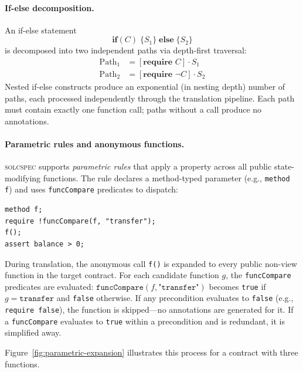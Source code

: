 \paragraph{If-else decomposition.}
An if-else statement
\[
\textbf{if}(C)\; \{S_1\}\; \textbf{else}\; \{S_2\}
\]
is decomposed into two independent paths via depth-first traversal:
\begin{align*}
\text{Path}_1 &= [\textbf{require } C] \cdot S_1 \\
\text{Path}_2 &= [\textbf{require } \neg C] \cdot S_2
\end{align*}
Nested if-else constructs produce an exponential (in nesting depth) number of paths, each processed independently through the translation pipeline. Each path must contain exactly one function call; paths without a call produce no annotations.

\paragraph{Parametric rules and anonymous functions.}
\textsc{solcspec} supports \emph{parametric rules} that apply a property across all public state-modifying functions. The rule declares a method-typed parameter (e.g., \texttt{method f}) and uses \texttt{funcCompare} predicates to dispatch:

\begin{lstlisting}[language=Solidity,basicstyle=\small\ttfamily]
method f;
require !funcCompare(f, "transfer");
f();
assert balance > 0;
\end{lstlisting}

\noindent During translation, the anonymous call \texttt{f()} is expanded to every public non-view function in the target contract. For each candidate function $g$, the \texttt{funcCompare} predicates are evaluated: $\texttt{funcCompare}(f, \texttt{"transfer"})$ becomes \texttt{true} if $g = \texttt{transfer}$ and \texttt{false} otherwise. If any precondition evaluates to \texttt{false} (e.g., \texttt{require false}), the function is skipped---no annotations are generated for it. If a \texttt{funcCompare} evaluates to \texttt{true} within a precondition and is redundant, it is simplified away.

Figure~\ref{fig:parametric-expansion} illustrates this process for a contract with three functions.

